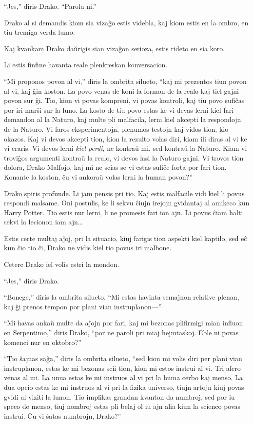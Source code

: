 ``Jes,'' diris Drako. ``Parolu ni.''

Drako al si demandis kiom sia vizaĝo estis videbla, kaj kiom estis en
la ombro, en tiu tremiga verda lumo.

Kaj kvankam Drako daŭrigis sian vizaĝon serioza, estis rideto en sia
koro.

Li estis finfine havanta reale plenkreskan konversacion.

``Mi proponos povon al vi,'' diris la ombrita silueto, ``kaj mi
prezentos tiun povon al vi, kaj ĝin koston. La povo venas de koni la
formon de la realo kaj tiel gajni povon sur ĝi. Tio, kion vi povas
kompreni, vi povas kontroli, kaj tiu povo sufiĉas por iri marŝi sur la
luno. La kosto de tiu povo estas ke vi devas lerni kiel fari demandon
al la Naturo, kaj multe pli malfacila, lerni kiel akcepti la
respondojn de la Naturo. Vi faros eksperimentojn, plenumos testojn kaj
vidos tion, kio okazos. Kaj vi devos akcepti tion, kion la rezulto
volas diri, kiam ili diras al vi ke vi eraris. Vi devos lerni
\emph{kiel perdi}, ne kontraŭ mi, sed kontraŭ la Naturo. Kiam vi
troviĝos argumenti kontraŭ la realo, vi devos lasi la Naturo gajni. Vi
trovos tion dolora, Drako Malfojo, kaj mi ne scias se vi estas sufiĉe
forta por fari tion. Konante la koston, ĉu vi ankoraŭ volas lerni la
human povon?''

Drako spiris profunde. Li jam pensis pri tio. Kaj estis malfacile vidi
kiel li povus respondi malsame. Oni postulis, ke li sekvu ĉiujn
irejojn gvidantaj al amikeco kun Harry Potter. Tio estis nur lerni, li
ne promesis fari ion ajn. Li povus ĉiam halti sekvi la lecionon iam
ajn\ldots

Estis certe multaj aĵoj, pri la situacio, kiuj farigis tion aspekti
kiel kaptilo, sed eĉ kun ĉio tio ĉi, Drako ne vidis kiel tio povus iri
malbone.

Cetere Drako iel volis estri la mondon.

``Jes,'' diris Drako.

``Bonege,'' diris la ombrita silueto. ``Mi estas havinta semajnon
relative plenan, kaj ĝi prenos tempon por plani vian instruplanon—''

``Mi havas ankaŭ multe da aĵojn por fari, kaj mi bezonas plifirmigi
mian influon en Serpentimo,'' diris Drako, ``por ne paroli pri miaj
hejmtaskoj. Eble ni povas komenci nur en oktobro?''

``Tio ŝajnas saĝa,'' diris la ombrita silueto, ``sed kion mi volis
diri per plani vian instruplanon, estas ke mi bezonas scii tion, kion
mi estos instrui al vi. Tri afero venas al mi. La unua estas ke mi
instruos al vi pri la huma cerbo kaj menso. La dua opcio estas ke mi
instruos al vi pri la fizika universo, tiujn artojn kiuj povas gvidi
al viziti la lunon. Tio implikas grandan kvanton da numbroj, sed por
iu speco de menso, tiuj nombroj estas pli belaj ol iu ajn alia kiun la
scienco povas instrui. Ĉu vi ŝatas numbrojn, Drako?''

